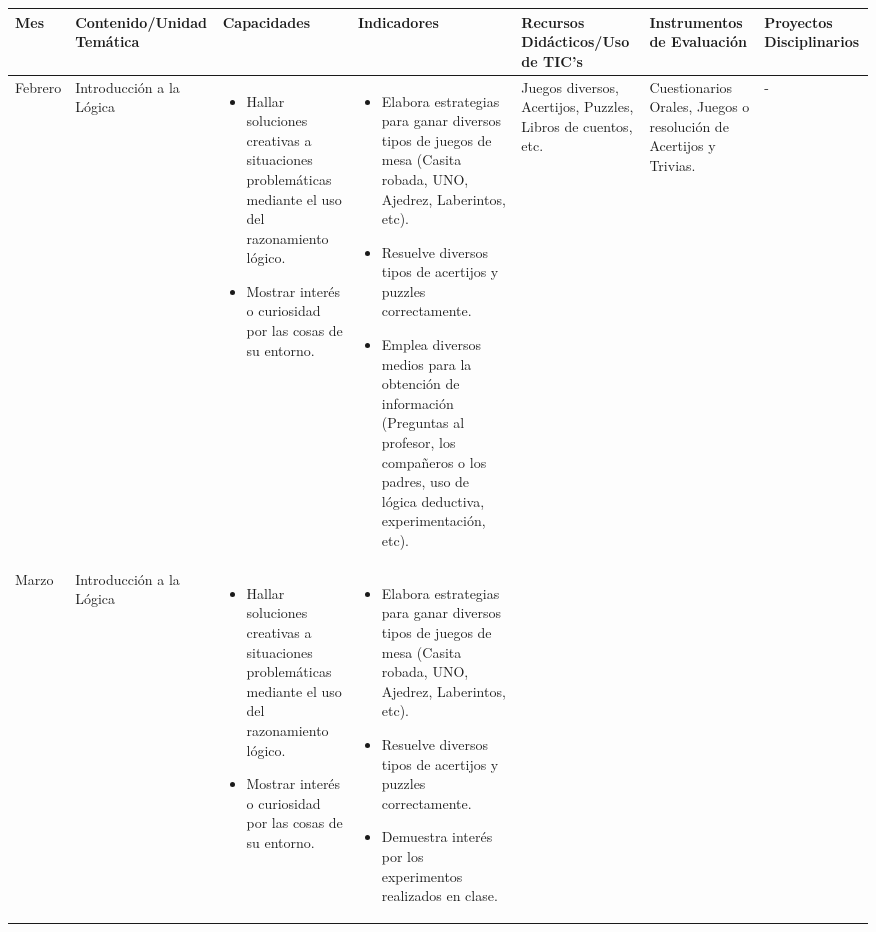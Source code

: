 \documentclass[landscape, a4paper, 10pt]{article}
\newcommand{\smallcellwidth}{0.7in}
\newcommand{\normalcellwidth}{1.2in}
\newcommand{\bigcellwidth}{2.0in}
\begin{document}
	\begin{longtable}{|m{\smallcellwidth}|p{\normalcellwidth}|p{\bigcellwidth}|p{\bigcellwidth}|p{\normalcellwidth}|p{\normalcellwidth}|p{\normalcellwidth}|}
		\hline
		\textbf{Mes} &
		\textbf{Contenido/Unidad Temática} &
		\textbf{Capacidades} &
		\textbf{Indicadores} &
		\textbf{Recursos Didácticos/Uso de TIC's} &
		\textbf{Instrumentos de Evaluación} &
		\textbf{Proyectos Disciplinarios} \\
		\hline
		\endhead
		Febrero &
		Introducción a la Lógica &
		\begin{itemize}
			\item Hallar soluciones creativas a situaciones problemáticas mediante el uso del razonamiento lógico.
			\item Mostrar interés o curiosidad por las cosas de su entorno.
		\end{itemize} &
		\begin{itemize}
			\item Elabora estrategias para ganar diversos tipos de juegos de mesa (Casita robada, UNO, Ajedrez, Laberintos, etc).
			\item Resuelve diversos tipos de acertijos y puzzles correctamente.
			\item Emplea diversos medios para la obtención de información (Preguntas al profesor, los compañeros o los padres, uso de lógica deductiva, experimentación, etc).
 		\end{itemize} &
		Juegos diversos, Acertijos, Puzzles, Libros de cuentos, etc. &
		Cuestionarios Orales, Juegos o resolución de Acertijos y Trivias. &
		 - \\
		\hline
		Marzo &
		Introducción a la Lógica &
		\begin{itemize}
			\item Hallar soluciones creativas a situaciones problemáticas mediante el uso del razonamiento lógico.
			\item Mostrar interés o curiosidad por las cosas de su entorno.
		\end{itemize} &
		\begin{itemize}
			\item Elabora estrategias para ganar diversos tipos de juegos de mesa (Casita robada, UNO, Ajedrez, Laberintos, etc).
			\item Resuelve diversos tipos de acertijos y puzzles correctamente.
			\item Demuestra interés por los experimentos realizados en clase.

\end{itemize}
\end{longtable}
\end{document}
